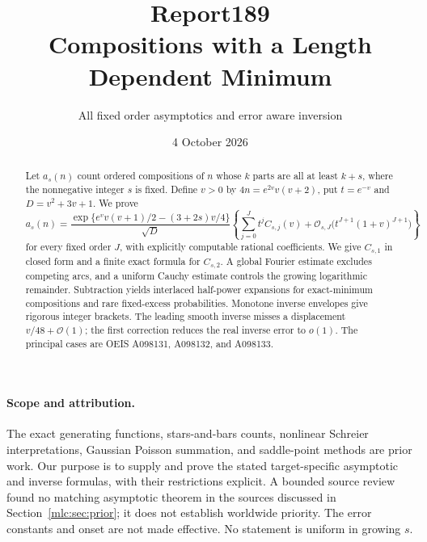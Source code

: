 \documentclass[11pt]{article}
\title{Report189\\[5pt]Compositions with a Length Dependent Minimum}
\author{All fixed order asymptotics and error aware inversion}
\date{4 October 2026}
\theoremstyle{remark}\newtheorem{remark}[theorem]{Remark}
\newcommand{\OO}{\mathcal O}
\begin{document}
\maketitle
\begin{abstract}
Let $a_s(n)$ count ordered compositions of $n$ whose $k$ parts are all at least $k+s$, where the nonnegative integer $s$ is fixed. Define $v>0$ by $4n=e^{2v}v(v+2)$, put $t=e^{-v}$ and $D=v^2+3v+1$. We prove
\[
 a_s(n)=\frac{\exp\{e^v v(v+1)/2-(3+2s)v/4\}}{\sqrt D}
 \left\{\sum_{j=0}^{J}t^jC_{s,j}(v)
       +\OO_{s,J}\bigl(t^{J+1}(1+v)^{J+1}\bigr)\right\}
\]
for every fixed order $J$, with explicitly computable rational coefficients. We give $C_{s,1}$ in closed form and a finite exact formula for $C_{s,2}$. A global Fourier estimate excludes competing arcs, and a uniform Cauchy estimate controls the growing logarithmic remainder. Subtraction yields interlaced half-power expansions for exact-minimum compositions and rare fixed-excess probabilities. Monotone inverse envelopes give rigorous integer brackets. The leading smooth inverse misses a displacement $v/48+\OO(1)$; the first correction reduces the real inverse error to $o(1)$. The principal cases are OEIS A098131, A098132, and A098133.
\end{abstract}

\paragraph{Scope and attribution.}
The exact generating functions, stars-and-bars counts, nonlinear Schreier interpretations, Gaussian Poisson summation, and saddle-point methods are prior work. Our purpose is to supply and prove the stated target-specific asymptotic and inverse formulas, with their restrictions explicit. A bounded source review found no matching asymptotic theorem in the sources discussed in Section~\ref{mlc:sec:prior}; it does not establish worldwide priority. The error constants and onset are not made effective. No statement is uniform in growing $s$.
\end{document}
